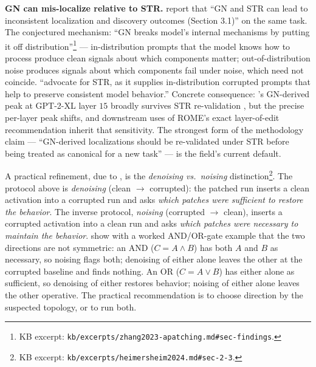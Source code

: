 \begin{contradiction}
\textbf{GN can mis-localize relative to STR.}
\citet[\S 1]{zhang2023-apatching} report that ``GN and STR can lead to
inconsistent localization and  discovery outcomes (Section
3.1)'' on the same task. The conjectured mechanism: ``GN breaks
model's internal mechanisms by putting it off
distribution''\footnote{KB excerpt:
\nolinkurl{kb/excerpts/zhang2023-apatching.md#sec-findings}.} ---
in-distribution prompts that the model knows how to process produce
clean signals about which components matter; out-of-distribution noise
produces signals about which components fail under noise, which need
not coincide. \citet[\S 1]{zhang2023-apatching} ``advocate for STR, as
it supplies in-distribution corrupted prompts that help to preserve
consistent model behavior.'' Concrete consequence:
\citet{meng2022-rome}'s GN-derived  peak at GPT-2-XL layer $15$
broadly survives STR re-validation \citep[\S 3]{zhang2023-apatching},
but the precise per-layer peak shifts, and downstream uses of ROME's
exact layer-of-edit recommendation inherit that sensitivity. The
strongest form of the methodology claim --- ``GN-derived localizations
should be re-validated under STR before being treated as canonical
for a new task'' --- is the field's current default.
\end{contradiction}

A practical refinement, due to
\citet[\S 2.3]{heimersheim2024-apatching-howto}, is the
\emph{denoising vs.\ noising} distinction\footnote{KB excerpt:
\nolinkurl{kb/excerpts/heimersheim2024.md#sec-2-3}.}. The protocol
above is \emph{denoising} (clean $\to$ corrupted): the patched run
inserts a clean activation into a corrupted run and asks
\emph{which patches were sufficient to restore the behavior}. The
inverse protocol, \emph{noising} (corrupted $\to$ clean), inserts a
corrupted activation into a clean run and asks
\emph{which patches were necessary to maintain the behavior}.
\citet[\S 2.4]{heimersheim2024-apatching-howto} show with a worked
AND/OR-gate example that the two directions are not symmetric: an AND
 ($C = A \wedge B$) has both $A$ and $B$ as necessary, so
noising flags both; denoising of either alone leaves the other at the
corrupted baseline and finds nothing. An OR  ($C = A \vee B$)
has either alone as sufficient, so denoising of either restores
behavior; noising of either alone leaves the other operative. The
practical recommendation is to choose direction by the suspected
 topology, or to run both.

